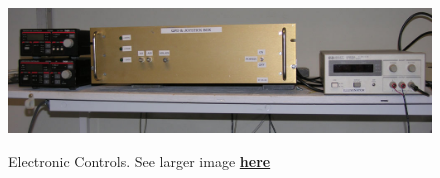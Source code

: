 \documentclass{../lab}
\begin{document}
\begin{figure}[H]
\begin{minipage}{0.8\textwidth}
    \href{http://experimentationlab.berkeley.edu/sites/default/files/images/OTZ_Controls_0142B.jpg}{\includegraphics[width=\linewidth,keepaspectratio]{images/OTZ_Controls_0142B.jpg}}
    \caption{Electronic Controls. See larger image \href{http://experimentationlab.berkeley.edu/sites/default/files/images/OTZ_Controls_0142B.jpg}{\textbf{here}}}
\end{minipage}
\end{figure}
\end{document}
